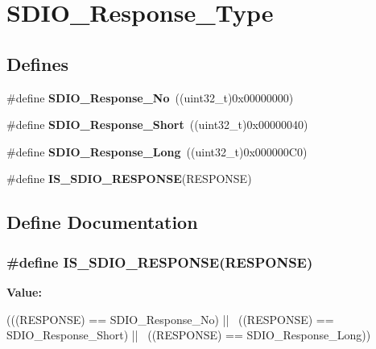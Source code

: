 \hypertarget{group__SDIO__Response__Type}{
\section{SDIO\_\-Response\_\-Type}
\label{group__SDIO__Response__Type}
}
\subsection*{Defines}
\begin{DoxyCompactItemize}
\item 
\hypertarget{group__SDIO__Response__Type_ga308b8ef0e79ba451644dda923bb3ac41}{
\#define {\bfseries SDIO\_\-Response\_\-No}~((uint32\_\-t)0x00000000)}
\label{group__SDIO__Response__Type_ga308b8ef0e79ba451644dda923bb3ac41}

\item 
\hypertarget{group__SDIO__Response__Type_ga1f61768f90641648fd5c12e8d2f7e508}{
\#define {\bfseries SDIO\_\-Response\_\-Short}~((uint32\_\-t)0x00000040)}
\label{group__SDIO__Response__Type_ga1f61768f90641648fd5c12e8d2f7e508}

\item 
\hypertarget{group__SDIO__Response__Type_ga1a11a8750612b344214f846784046bb0}{
\#define {\bfseries SDIO\_\-Response\_\-Long}~((uint32\_\-t)0x000000C0)}
\label{group__SDIO__Response__Type_ga1a11a8750612b344214f846784046bb0}

\item 
\#define {\bfseries IS\_\-SDIO\_\-RESPONSE}(RESPONSE)
\end{DoxyCompactItemize}


\subsection{Define Documentation}
\hypertarget{group__SDIO__Response__Type_gae4df2359c9b637694b9baa220c16e062}{
\subsubsection[{IS\_\-SDIO\_\-RESPONSE}]{\setlength{\rightskip}{0pt plus 5cm}\#define IS\_\-SDIO\_\-RESPONSE(RESPONSE)}}
\label{group__SDIO__Response__Type_gae4df2359c9b637694b9baa220c16e062}
{\bfseries Value:}
\begin{DoxyCode}
(((RESPONSE) == SDIO_Response_No) || \
                                    ((RESPONSE) == SDIO_Response_Short) || \
                                    ((RESPONSE) == SDIO_Response_Long))
\end{DoxyCode}
